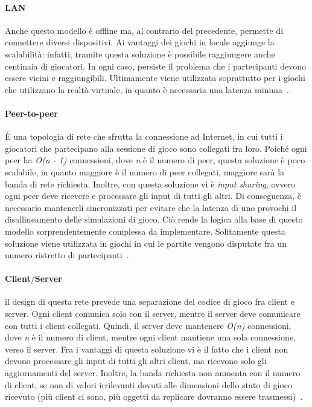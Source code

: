 \paragraph{LAN}
Anche questo modello è offline ma, al contrario del precedente, permette di connettere diversi dispositivi. Ai vantaggi dei giochi in locale aggiunge la scalabilità: infatti, tramite questa soluzione è possibile raggiungere anche centinaia di giocatori. In ogni caso, persiste il problema che i partecipanti devono essere vicini e raggiungibili. Ultimamente viene utilizzata soprattutto per i giochi che utilizzano la realtà virtuale, in quanto è necessaria una latenza minima~\cite{youtube:realtime-multiplayer}.

\paragraph{Peer-to-peer}
È una topologia di rete che sfrutta la connessione ad Internet, in cui tutti i giocatori che partecipano alla sessione di gioco sono collegati fra loro. Poiché ogni peer ha \emph{O(n - 1)} connessioni, dove \emph{n} è il numero di peer, questa soluzione è poco scalabile, in quanto maggiore è il numero di peer collegati, maggiore sarà la banda di rete richiesta. Inoltre, con questa soluzione vi è \emph{input sharing}, ovvero ogni peer deve ricevere e processare gli input di tutti gli altri. Di conseguenza, è necessario mantenerli sincronizzati per evitare che la latenza di uno provochi il disallineamento delle simulazioni di gioco. Ciò rende la logica alla base di questo modello sorprendentemente complessa da implementare. Solitamente questa soluzione viene utilizzata in giochi in cui le partite vengono disputate fra un numero ristretto di partecipanti~\cite{book:multiplayergameprogramming}.

\paragraph{Client$/$Server}
il design di questa rete prevede una separazione del codice di gioco fra client e server. Ogni client comunica solo con il server, mentre il server deve comunicare con tutti i client collegati. Quindi, il server deve mantenere \emph{O(n)} connessioni, dove \emph{n} è il numero di client, mentre ogni client mantiene una sola connessione, verso il server. Fra i vantaggi di questa soluzione vi è il fatto che i client non devono processare gli input di tutti gli altri client, ma ricevono solo gli aggiornamenti del server. Inoltre, la banda richiesta non aumenta con il numero di client, se non di valori irrilevanti dovuti alle dimensioni dello stato di gioco ricevuto (più client ci sono, più oggetti da replicare dovranno essere trasmessi)~\cite{book:multiplayergameprogramming}.

